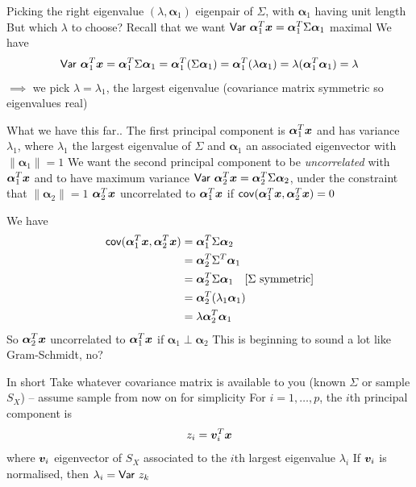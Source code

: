 \documentclass[aspectratio=169]{beamer}\usepackage[]{graphicx}\usepackage[]{xcolor}
\begin{document}
\begin{frame}{Picking the right eigenvalue}
$(\lambda,\bm{\alpha}_1)$ eigenpair of $\Sigma$, with $\bm{\alpha}_1$ having unit length
\vfill
But which $\lambda$ to choose?
\vfill
Recall that we want $\mathsf{Var}\  \bm{\alpha}_1^T\bm{x}=\bm{\alpha}_1^T\Sigma\bm{\alpha}_1$ maximal
\vfill
We have
\[
\mathsf{Var}\  \bm{\alpha}_1^T\bm{x} 
= \bm{\alpha}_1^T\Sigma\bm{\alpha}_1 
= \bm{\alpha}_1^T(\Sigma\bm{\alpha}_1) 
= \bm{\alpha}_1^T(\lambda\bm{\alpha}_1) 
= \lambda(\bm{\alpha}_1^T\bm{\alpha}_1) = \lambda
\]
\vfill
$\implies$ we pick $\lambda=\lambda_1$, the largest eigenvalue (covariance matrix symmetric so eigenvalues real)
\end{frame}


\begin{frame}{What we have this far..}
The first principal component is $\bm{\alpha}_1^T\bm{x}$ and has variance $\lambda_1$, where $\lambda_1$ the largest eigenvalue of $\Sigma$ and $\bm{\alpha}_1$ an associated eigenvector with $\|\bm{\alpha}_1\|=1$
\vfill
We want the second principal component to be \emph{uncorrelated} with $\bm{\alpha}_1^T\bm{x}$ and to have maximum variance $\mathsf{Var}\  \bm{\alpha}_2^T\bm{x}=\bm{\alpha}_2^T\Sigma\bm{\alpha}_2$, under the constraint that $\|\bm{\alpha}_2\|=1$
\vfill
$\bm{\alpha}_2^T\bm{x}$ uncorrelated to $\bm{\alpha}_1^T\bm{x}$ if $\mathsf{cov}(\bm{\alpha}_1^T\bm{x},\bm{\alpha}_2^T\bm{x})=0$
\end{frame}

\begin{frame}
We have
\begin{align*}
\mathsf{cov}(\bm{\alpha}_1^T\bm{x},\bm{\alpha}_2^T\bm{x}) &= 
\bm{\alpha}_1^T\Sigma\bm{\alpha}_2 \\
&= \bm{\alpha}_2^T\Sigma^T\bm{\alpha}_1 \\
&= \bm{\alpha}_2^T\Sigma\bm{\alpha}_1 \quad\textrm{[$\Sigma$ symmetric]} \\
&= \bm{\alpha}_2^T(\lambda_1\bm{\alpha}_1) \\
&= \lambda \bm{\alpha}_2^T\bm{\alpha}_1
\end{align*}
\vfill
So $\bm{\alpha}_2^T\bm{x}$ uncorrelated to $\bm{\alpha}_1^T\bm{x}$ if $\bm{\alpha}_1\perp\bm{\alpha}_2$
\vfill
This is beginning to sound a lot like Gram-Schmidt, no?
\end{frame}

\begin{frame}{In short}
Take whatever covariance matrix is available to you (known $\Sigma$ or sample $S_X$) -- assume sample from now on for simplicity
\vfill
For $i=1,\ldots,p$, the $i$th principal component is
\[
z_i = \bm{v}_i^T\bm{x}
\]
where $\bm{v}_i$ eigenvector of $S_X$ associated to the $i$th largest eigenvalue $\lambda_i$
\vfill
If $\bm{v}_i$ is normalised, then $\lambda_i=\mathsf{Var}\  z_k$
\end{frame}
\end{document}
